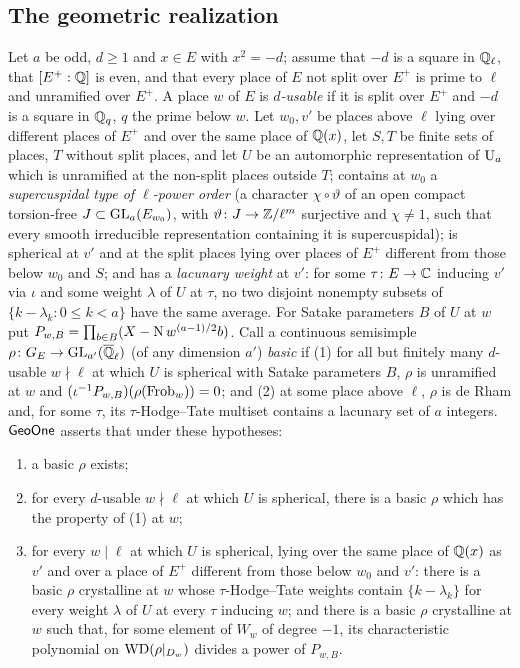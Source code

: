 \subsection{The geometric realization}\label{sec:galois:geo}

\begin{definition}\label{def:galois:geoone}
Let $a$ be odd, $d\ge1$ and $x\in E$ with $x^2=-d$; assume that $-d$ is a square in $\mathbb{Q}_\ell$, that
$[E^+:\mathbb{Q}]$ is even, and that every place of $E$ not split over $E^+$ is prime to $\ell$ and unramified
over $E^+$. A place $w$ of $E$ is \emph{$d$-usable} if it is split over $E^+$ and $-d$ is a square in
$\mathbb{Q}_q$, $q$ the prime below $w$. Let $w_0,v'$ be places above $\ell$ lying over different places of
$E^+$ and over the same place of $\mathbb{Q}(x)$, let $S,T$ be finite sets of places, $T$ without split
places, and let $U$ be an automorphic representation of $\mathrm{U}_a$ which is unramified at the
non-split places outside $T$; contains at $w_0$ a \emph{supercuspidal type of $\ell$-power order} (a
character $\chi\circ\vartheta$ of an open compact torsion-free $J\subset\operatorname{GL}_a(E_{w_0})$, with
$\vartheta\colon J\to\mathbb{Z}/\ell^m$ surjective and $\chi\ne1$, such that every smooth irreducible
representation containing it is supercuspidal); is spherical at $v'$ and at the split places lying
over places of $E^+$ different from those below $w_0$ and $S$; and has a \emph{lacunary weight} at
$v'$: for some $\tau\colon E\to\mathbb{C}$ inducing $v'$ via $\iota$ and some weight $\lambda$ of $U$ at $\tau$, no
two disjoint nonempty subsets of $\{k-\lambda_k:0\le k<a\}$ have the same average. For Satake
parameters $B$ of $U$ at $w$ put $P_{w,B}=\prod_{b\in B}(X-\operatorname{N} w^{(a-1)/2}b)$. Call a continuous
semisimple $\rho\colon G_E\to\operatorname{GL}_{a'}(\overline{\mathbb{Q}}_\ell)$ (of any dimension $a'$) \emph{basic} if (1) for all but
finitely many $d$-usable $w\nmid\ell$ at which $U$ is spherical with Satake parameters $B$, $\rho$ is
unramified at $w$ and $(\iota^{-1}P_{w,B})(\rho(\operatorname{Frob}_w))=0$; and (2) at some place above $\ell$, $\rho$ is
de Rham and, for some $\tau$, its $\tau$-Hodge--Tate multiset contains a lacunary set of $a$ integers.
$\mathsf{GeoOne}$ asserts that under these hypotheses:
\begin{enumerate}[label=(G\arabic*),nosep]
\item a basic $\rho$ exists;
\item for every $d$-usable $w\nmid\ell$ at which $U$ is spherical, there is a basic $\rho$ which has
  the property of (1) at $w$;
\item for every $w\mid\ell$ at which $U$ is spherical, lying over the same place of $\mathbb{Q}(x)$ as $v'$ and
  over a place of $E^+$ different from those below $w_0$ and $v'$: there is a basic $\rho$ crystalline at
  $w$ whose $\tau$-Hodge--Tate weights contain $\{k-\lambda_k\}$ for every weight $\lambda$ of $U$ at
  every $\tau$ inducing $w$; and there is a basic $\rho$ crystalline at $w$ such that, for some element
  of $W_w$ of degree $-1$, its characteristic polynomial on $\mathrm{WD}(\rho|_{D_w})$ divides a power of
  $P_{w,B}$.
\end{enumerate}
\end{definition}

